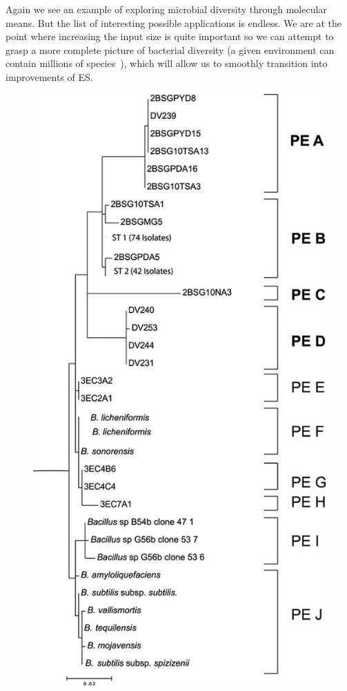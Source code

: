 Again we see an example of exploring microbial diversity through molecular means.
But the list of interesting possible applications is endless.
We are at the point where increasing the input size is quite important so we can attempt to grasp a more complete picture of bacterial diversity (a given environment can contain millions of species~\cite{cohan2008origins}), which will allow us to smoothly transition into improvements of ES.

\begin{figure}[h!]
\centering
\includegraphics[scale=0.5]{images/DeathValleyES-CH2}

\end{figure}
